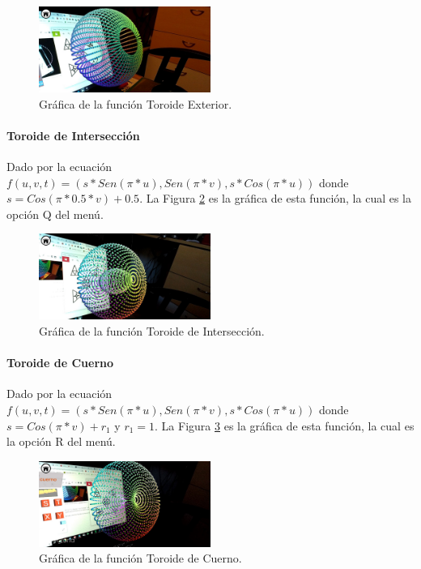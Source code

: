 \begin{figure}[hbt!]
\centering
\includegraphics[width=0.5\textwidth]{figuras/graficas/toroide_exterior.png}
\caption{\label{fig:graf_toroide_exterior}Gráfica de la función Toroide Exterior.}
\end{figure}
\FloatBarrier

\paragraph{Toroide de Intersección}
Dado por la ecuación $f(u,v,t)=(s*Sen(\pi * u), Sen(\pi *  v), s*Cos(\pi * u))$ donde $s = Cos(\pi * 0.5 * v) + 0.5$. La Figura \ref{fig:graf_toroide_interseccion} es la gráfica de esta función, la cual es la opción Q del menú.

\begin{figure}[hbt!]
\centering
\includegraphics[width=0.5\textwidth]{figuras/graficas/toroide_interseccion.png}
\caption{\label{fig:graf_toroide_interseccion}Gráfica de la función Toroide de Intersección.}
\end{figure}
\FloatBarrier

\paragraph{Toroide de Cuerno}
Dado por la ecuación $f(u,v,t)=(s*Sen(\pi * u), Sen(\pi *  v), s*Cos(\pi * u))$ donde $s = Cos(\pi * v)+r_1$ y $r_1 = 1$. La Figura \ref{fig:graf_toroide_cuerno} es la gráfica de esta función, la cual es la opción R del menú.

\begin{figure}[hbt!]
\centering
\includegraphics[width=0.5\textwidth]{figuras/graficas/toroide_cuerno.png}
\caption{\label{fig:graf_toroide_cuerno}Gráfica de la función Toroide de Cuerno.}
\end{figure}
\FloatBarrier

